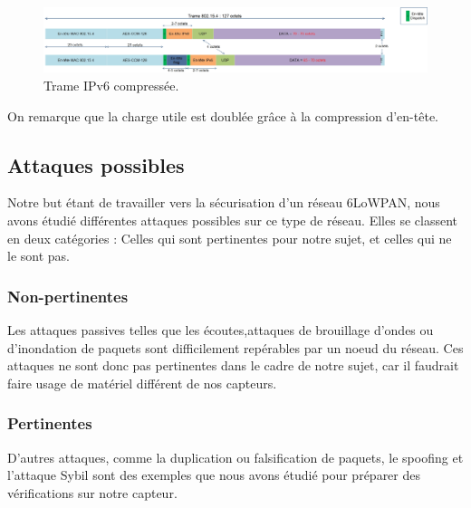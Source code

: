 		\begin{figure}[htp]
			\centering
			\includegraphics[width=17cm]{images/TrameComp.jpg}
			\caption{Trame IPv6 compressée.}
			\label{fig:tramecomp}
		\end{figure}
		On remarque que la charge utile est doublée grâce à la compression d'en-tête.
%	
	\subsection{Attaques possibles}
		Notre but étant de travailler vers la sécurisation d'un réseau 6LoWPAN, nous avons étudié différentes attaques possibles sur ce type de réseau. Elles se classent en deux catégories : Celles qui sont pertinentes pour notre sujet, et celles qui ne le sont pas.\\
		
		\subsubsection{Non-pertinentes}
			Les attaques passives telles que les écoutes,attaques de brouillage d'ondes ou d'inondation de paquets sont difficilement repérables par un noeud du réseau. Ces attaques ne sont donc pas pertinentes dans le cadre de notre sujet, car il faudrait faire usage de matériel différent de nos capteurs.
		\subsubsection{Pertinentes}
			D'autres attaques, comme la duplication ou falsification de paquets, le spoofing et l'attaque Sybil sont des exemples que nous avons étudié pour préparer des vérifications sur notre capteur.\\
			
